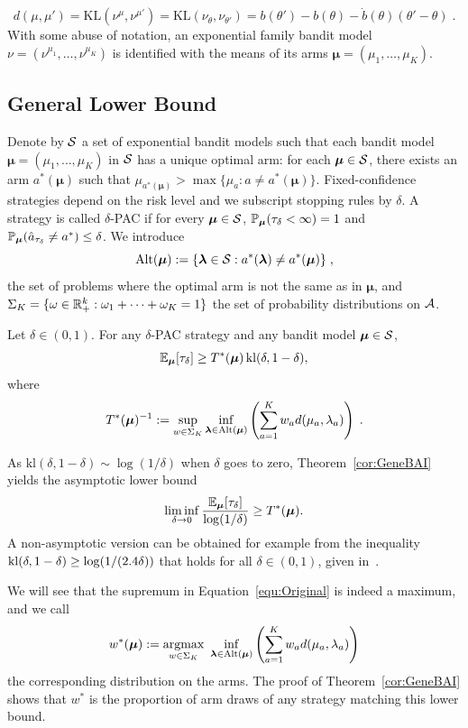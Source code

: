\documentclass{colt2016} %
\begin{document}
\[%
d(\mu,\mu') = \text{KL}(\nu^{\mu},\nu^{\mu'}) = \text{KL}(\nu_\theta,\nu_{\theta'})=b(\theta')-b(\theta)-\dot{b}(\theta)(\theta'-\theta) \;.\]%
With some abuse of notation, an exponential family bandit model $\nu=(\nu^{\mu_1},\dots,\nu^{\mu_K})$ is identified with the means of its arms  $\bm \mu = (\mu_1,\dots,\mu_K)$.


\subsection{General Lower Bound}
Denote by $\mathcal{S}$ a set of exponential bandit models such that each bandit model $\bm{\mu} =(\mu_1,\dots,\mu_K)$ in $\mathcal{S}$ has a unique optimal arm: for each $\bm{\mu}\in \mathcal{S}$, there exists an arm $a^*(\bm \mu)$ such that $\mu_{a^*(\bm \mu)} > \max \{ \mu_a : a \neq a^*(\bm \mu)\}$.
Fixed-confidence strategies depend on the risk level and we subscript stopping rules by $\delta$. A strategy is called $\delta$-PAC if for every $\bm \mu \in \mathcal{S}$, $\mathbb{P}_{\bm \mu}(\tau_\delta < \infty) = 1$ and  $\mathbb{P}_{\bm \mu}(\hat{a}_{\tau_\delta} \neq a^*) \leq \delta$.
We introduce \[\mathrm{Alt}(\bm \mu) := \{ \bm\lambda \in \mathcal{S} : a^*(\bm\lambda) \neq a^*(\bm \mu)\}\;,\]
the set of problems where the optimal arm is not the same as in $\bm\mu$, and $\Sigma_K=\{\omega\in\mathbb{R}^k_+ : \omega_1+\dots+\omega_K=1\}$ the set of probability distributions on $\mathcal{A}$.
\begin{theorem}\label{cor:GeneBAI} Let $\delta \in (0,1)$. 
For any $\delta$-PAC strategy and any bandit model $\bm\mu\in\mathcal{S}$,  
\[\mathbb{E}_{\bm \mu}[\tau_\delta] \geq T^*(\bm\mu)\,\mathrm{kl}(\delta,1-\delta), \]
where %
\begin{equation}
T^*(\bm \mu)^{-1} := \sup_{w \in \Sigma_K} \inf_{\bm \lambda \in \mathrm{Alt}(\bm\mu)} \left( \sum_{a=1}^K w_a d(\mu_a,\lambda_a)\right)\;.\label{equ:Original} 
\end{equation}
\end{theorem}

\begin{remark} As $\mathrm{kl}(\delta,1-\delta) \sim \log(1/\delta)$ when $\delta$ goes to zero, Theorem~\ref{cor:GeneBAI} yields the asymptotic lower bound
\[\liminf_{\delta \rightarrow 0} \frac{\mathbb{E}_{\bm \mu}[\tau_\delta]}{\log(1/\delta)} \geq T^*(\bm \mu).\]
A non-asymptotic version can be obtained for example from the inequality $\mathrm{kl}(\delta,1-\delta) \geq \log(1/(2.4\delta))$ that holds for all $\delta\in(0,1)$, given in~\cite{JMLR15}.
\end{remark}
We will see that the supremum in Equation~\eqref{equ:Original} is indeed a maximum, and we call   
\[w^*(\bm\mu): = \underset{w \in \Sigma_K}{\text{argmax}} \ \inf_{\bm \lambda \in \mathrm{Alt}(\bm\mu)} \left( \sum_{a=1}^K w_a d(\mu_a,\lambda_a)\right)\]
the corresponding distribution on the arms. 
The proof of Theorem~\ref{cor:GeneBAI} shows that $w^*$ is the  proportion of arm draws of any strategy matching this lower bound. 
\end{document}
